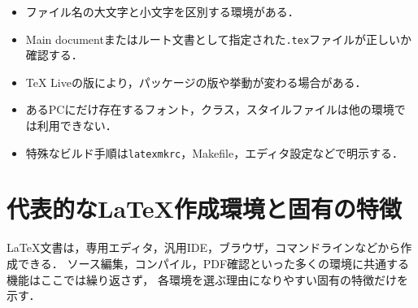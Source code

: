 \documentclass[a4paper,11pt]{jsarticle}
\newcommand{\code}[1]{\texttt{#1}}
\begin{document}
\begin{itemize}
  \item ファイル名の大文字と小文字を区別する環境がある．
  \item Main documentまたはルート文書として指定された\code{.tex}ファイルが正しいか確認する．
  \item TeX Liveの版により，パッケージの版や挙動が変わる場合がある．
  \item あるPCにだけ存在するフォント，クラス，スタイルファイルは他の環境では利用できない．
  \item 特殊なビルド手順は\code{latexmkrc}，Makefile，エディタ設定などで明示する．
\end{itemize}

\clearpage
\section{代表的なLaTeX作成環境と固有の特徴}

LaTeX文書は，専用エディタ，汎用IDE，ブラウザ，コマンドラインなどから作成できる．
ソース編集，コンパイル，PDF確認といった多くの環境に共通する機能はここでは繰り返さず，
各環境を選ぶ理由になりやすい固有の特徴だけを示す．
\end{document}
